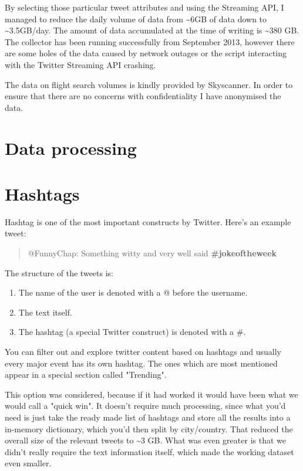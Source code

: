 \documentclass[minf,frontabs,twoside,singlespacing,parskip]{infthesis}
\begin{document}
By selecting those particular tweet attributes and using the Streaming API, I managed to reduce the daily volume of data from \textasciitilde 6GB of data down to \textasciitilde 3.5GB/day.
The amount of data accumulated at the time of writing is \textasciitilde 380 GB. The collector has been running successfully from September 2013, however there are some holes of the data caused by network outages or the script interacting with the Twitter Streaming API crashing. 

The data on flight search volumes is kindly provided by Skyscanner. In order to ensure that there are no concerns with confidentiality I have anonymised the data. 

\section{Data processing}
\label{sec:dp}

\section{Hashtags}
\label{sec:hashtag}

Hashtag is one of the most important constructs by Twitter. Here's an example tweet:

\begin{quotation}
@FunnyChap: Something witty and very well said \bf{\#jokeoftheweek}
\end{quotation}

The structure of the tweets is:
\begin{enumerate}
\item The name of the user is denoted with a @ before the username.
\item The text itself.
\item The hashtag (a special Twitter construct) is denoted with a \#.
\end{enumerate}

You can filter out and explore twitter content based on hashtags and usually every major event has its own hashtag. The ones which are most mentioned appear in a special section called "Trending".

This option was considered, because if it had worked it would have been what we would call a "quick win". It doesn't require much processing, since what you'd need is just take the ready made list of hashtags and store all the results into a in-memory dictionary, which you'd then split by city/country. That reduced the overall size of the relevant tweets to \textasciitilde 3 GB. What was even greater is that we didn't really require the text information itself, which made the working dataset even smaller. 
\end{document}
